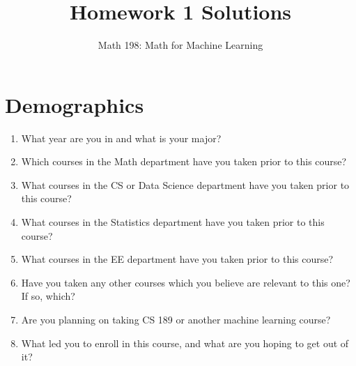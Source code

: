 \documentclass{article}
\title{Homework 1 Solutions}
\author{Math 198: Math for Machine Learning}
\date{}
\begin{document}
\maketitle

\section{Demographics}
\begin{enumerate}[label=\arabic*.]
\item What year are you in and what is your major?
\item Which courses in the Math department have you taken prior to this course?
\item What courses in the CS or Data Science department have you taken prior to this course?
\item What courses in the Statistics department have you taken prior to this course?
\item What courses in the EE department have you taken prior to this course?
\item Have you taken any other courses which you believe are relevant to this one? If so, which?
\item Are you planning on taking CS 189 or another machine learning course?
\item What led you to enroll in this course, and what are you hoping to get out of it?
\end{enumerate}
\end{document}
